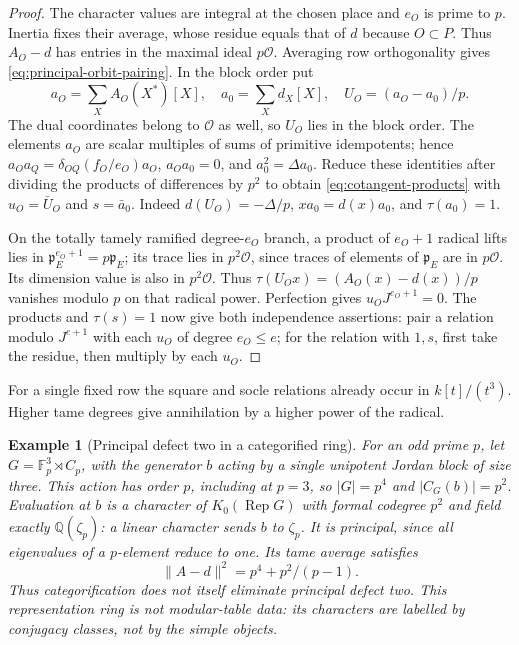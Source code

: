 \documentclass[11pt,a4paper]{article}
\numberwithin{equation}{section}
\newtheorem{example}[theorem]{Example}
\theoremstyle{remark}
\newcommand{\Rep}{\operatorname{Rep}}
\newcommand{\QQ}{\mathbb Q}
\newcommand{\OO}{\mathcal O}
\begin{document}
\begin{proof}
The character values are integral at the chosen place and $e_O$ is
prime to $p$. Inertia fixes their average, whose residue equals that
of $d$ because $O\subset P$. Thus $A_O-d$ has entries in the
maximal ideal $p\mathcal O$.
Averaging row orthogonality gives \eqref{eq:principal-orbit-pairing}.
In the block order put
\[
 a_O=\sum_X A_O(X^*)[X],\quad a_0=\sum_X d_X[X],\quad
 U_O=(a_O-a_0)/p .
\]
The dual coordinates belong to $\mathcal O$ as well, so $U_O$ lies in the block order. The elements $a_O$
are scalar multiples of sums of primitive idempotents; hence
$a_O a_Q=\delta_{OQ}(f_O/e_O)a_O$, $a_Oa_0=0$, and $a_0^2=\Delta a_0$.
Reduce these identities after dividing the products of differences
by $p^2$ to obtain \eqref{eq:cotangent-products} with
$u_O=\bar U_O$ and $s=\bar a_0$. Indeed $d(U_O)=-\Delta/p$,
$x a_0=d(x)a_0$, and $\tau(a_0)=1$.

On the totally tamely ramified degree-$e_O$ branch, a product of
$e_O+1$ radical lifts lies in $\mathfrak p_E^{e_O+1}=p\mathfrak p_E$;
its trace lies in $p^2\OO$, since traces of elements of
$\mathfrak p_E$ are in $p\OO$. Its dimension value is also in
$p^2\OO$. Thus $\tau(U_O x)=(A_O(x)-d(x))/p$ vanishes modulo $p$
on that radical power. Perfection gives $u_O J^{e_O+1}=0$.
The products and $\tau(s)=1$ now give both independence assertions:
pair a relation modulo $J^{e+1}$ with each $u_O$ of degree $e_O\le e$;
for the relation with $1,s$, first take the residue, then multiply by
each $u_O$.
\end{proof}
For a single fixed row the square and socle relations already occur
in $k[t]/(t^3)$. Higher tame degrees give annihilation by a higher
power of the radical.
\begin{example}[Principal defect two in a categorified ring]\label{fam:M:5.11}\label{ex:principal-defect-two-ring}
For an odd prime $p$, let $G=\mathbb F_p^3\rtimes C_p$, with
the generator $b$ acting by a single unipotent Jordan block of size
three. This action has order $p$, including at $p=3$, so
$|G|=p^4$ and $|C_G(b)|=p^2$. Evaluation at $b$ is a character
of $K_0(\Rep G)$ with formal codegree $p^2$ and field exactly
$\QQ(\zeta_p)$: a linear character sends $b$ to $\zeta_p$.
It is principal, since all eigenvalues of a $p$-element reduce to
one. Its tame average satisfies
\[
                         \|A-d\|^2=p^4+p^2/(p-1).
\]
Thus categorification does not itself eliminate principal defect two.
This representation ring is not modular-table data: its characters
are labelled by conjugacy classes, not by the simple objects.
\end{example}
\end{document}
